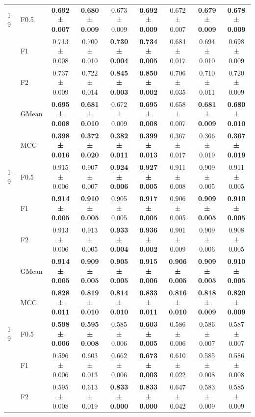 \begin{table}[H]
{\begin{tabular}{llccccccc}
\cline{1-9}
\multirow[t]{5}{*}{RandomForest} & F0.5 & \textbf{0.692 ± 0.007} & \textbf{0.680 ± 0.009} & 0.673 ± 0.009 & \textbf{0.692 ± 0.009} & 0.672 ± 0.007 & \textbf{0.679 ± 0.009} & \textbf{0.678 ± 0.009} \\
 & F1 & 0.713 ± 0.008 & 0.700 ± 0.010 & \textbf{0.730 ± 0.004} & \textbf{0.734 ± 0.005} & 0.684 ± 0.017 & 0.694 ± 0.010 & 0.698 ± 0.009 \\
 & F2 & 0.737 ± 0.009 & 0.722 ± 0.014 & \textbf{0.845 ± 0.003} & \textbf{0.850 ± 0.002} & 0.706 ± 0.035 & 0.710 ± 0.011 & 0.720 ± 0.009 \\
 & GMean & \textbf{0.695 ± 0.008} & \textbf{0.681 ± 0.010} & 0.672 ± 0.009 & \textbf{0.695 ± 0.008} & 0.658 ± 0.007 & \textbf{0.681 ± 0.009} & \textbf{0.680 ± 0.010} \\
 & MCC & \textbf{0.398 ± 0.016} & \textbf{0.372 ± 0.020} & \textbf{0.382 ± 0.011} & \textbf{0.399 ± 0.013} & 0.367 ± 0.017 & 0.366 ± 0.019 & \textbf{0.367 ± 0.019} \\
\cline{1-9}
\multirow[t]{5}{*}{TabICL} & F0.5 & 0.915 ± 0.006 & 0.907 ± 0.007 & \textbf{0.924 ± 0.006} & \textbf{0.927 ± 0.005} & 0.911 ± 0.008 & 0.909 ± 0.005 & 0.911 ± 0.005 \\
 & F1 & \textbf{0.914 ± 0.005} & \textbf{0.910 ± 0.005} & 0.905 ± 0.005 & \textbf{0.917 ± 0.005} & 0.906 ± 0.005 & \textbf{0.909 ± 0.005} & \textbf{0.910 ± 0.005} \\
 & F2 & 0.913 ± 0.006 & 0.913 ± 0.005 & \textbf{0.933 ± 0.004} & \textbf{0.936 ± 0.002} & 0.901 ± 0.009 & 0.909 ± 0.006 & 0.908 ± 0.005 \\
 & GMean & \textbf{0.914 ± 0.005} & \textbf{0.909 ± 0.005} & \textbf{0.905 ± 0.005} & \textbf{0.915 ± 0.006} & \textbf{0.906 ± 0.005} & \textbf{0.909 ± 0.005} & \textbf{0.910 ± 0.005} \\
 & MCC & \textbf{0.828 ± 0.011} & \textbf{0.819 ± 0.010} & \textbf{0.814 ± 0.010} & \textbf{0.833 ± 0.011} & \textbf{0.816 ± 0.010} & \textbf{0.818 ± 0.009} & \textbf{0.820 ± 0.009} \\
\cline{1-9}
\multirow[t]{5}{*}{TabM} & F0.5 & \textbf{0.598 ± 0.006} & \textbf{0.595 ± 0.008} & 0.585 ± 0.006 & \textbf{0.603 ± 0.005} & 0.586 ± 0.006 & 0.586 ± 0.007 & 0.587 ± 0.007 \\
 & F1 & 0.596 ± 0.006 & 0.603 ± 0.013 & 0.662 ± 0.006 & \textbf{0.673 ± 0.003} & 0.610 ± 0.022 & 0.585 ± 0.008 & 0.586 ± 0.008 \\
 & F2 & 0.595 ± 0.008 & 0.613 ± 0.019 & \textbf{0.833 ± 0.000} & \textbf{0.833 ± 0.000} & 0.647 ± 0.042 & 0.583 ± 0.009 & 0.585 ± 0.009 \\

\end{tabular}}
\end{table}
